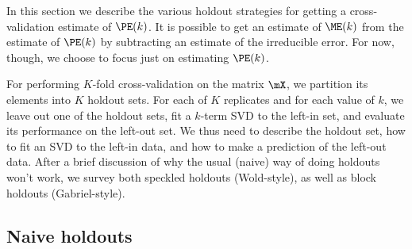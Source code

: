 In this section we describe the various holdout strategies for getting a
cross-validation estimate of $\PE(k)$. It is possible to get an estimate of
$\ME(k)$ from the estimate of $\PE(k)$ by subtracting an estimate of the
irreducible error. For now, though, we choose to focus just on estimating
$\PE(k)$.

For performing $K$-fold cross-validation on the matrix $\mX$, we partition its
elements into $K$ holdout sets. For each of $K$ replicates and for each value
of $k$, we leave out one of the holdout sets, fit a $k$-term SVD to the
left-in set, and evaluate its performance on the left-out set. We thus need to
describe the holdout set, how to fit an SVD to the left-in data, and how to
make a prediction of the left-out data. After a brief discussion of why the
usual (naive) way of doing holdouts won't work, we survey both speckled
holdouts (Wold-style), as well as block holdouts (Gabriel-style).

\subsection{Naive holdouts}

